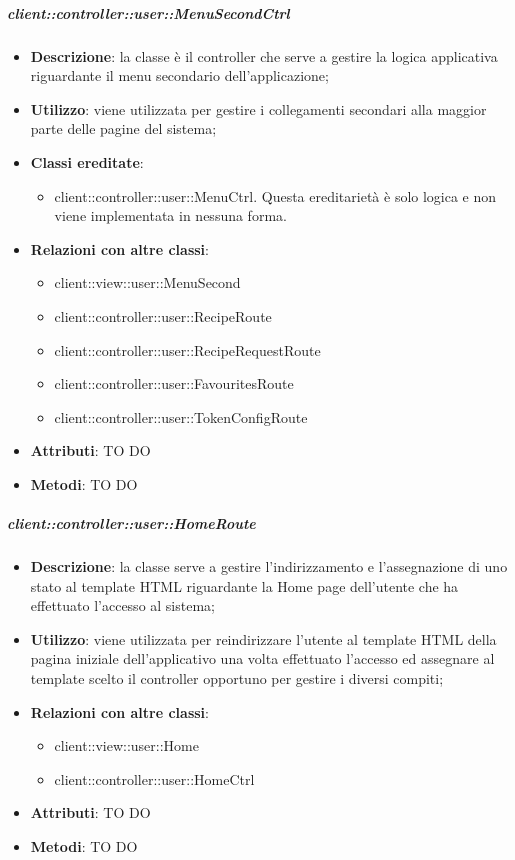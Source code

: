		\subparagraph{client::controller::user::MenuSecondCtrl} %
		\label{subp:client_controller_user_menusecondctrl}
			\begin{itemize}
				\item \textbf{Descrizione}: la classe è il controller che serve a gestire la logica applicativa riguardante il menu secondario dell'applicazione;
				\item \textbf{Utilizzo}: viene utilizzata per gestire i collegamenti secondari alla maggior parte delle pagine del sistema;
				\item \textbf{Classi ereditate}:
					\begin{itemize}
						\item client::controller::user::MenuCtrl. Questa ereditarietà è solo logica e non viene implementata in nessuna forma.
					\end{itemize}
				\item \textbf{Relazioni con altre classi}:
					\begin{itemize}
						\item client::view::user::MenuSecond
						\item client::controller::user::RecipeRoute
						\item client::controller::user::RecipeRequestRoute
						\item client::controller::user::FavouritesRoute
						\item client::controller::user::TokenConfigRoute
					\end{itemize}
				\item \textbf{Attributi}: TO DO
				\item \textbf{Metodi}: TO DO
			\end{itemize}


		\subparagraph{client::controller::user::HomeRoute} %
		\label{subp:bdsm_app_client_controller_user_homerouteconfig}
			\begin{itemize}
				\item \textbf{Descrizione}: la classe serve a gestire l'indirizzamento e l'assegnazione di uno stato al template HTML riguardante la Home page dell'utente che ha effettuato l'accesso al sistema;
				\item \textbf{Utilizzo}: viene utilizzata per reindirizzare l'utente al template HTML della pagina iniziale dell'applicativo una volta effettuato l'accesso ed assegnare al template scelto il controller opportuno per gestire i diversi compiti;
				\item \textbf{Relazioni con altre classi}:
					\begin{itemize}
						\item client::view::user::Home
						\item client::controller::user::HomeCtrl
					\end{itemize}
				\item \textbf{Attributi}: TO DO
				\item \textbf{Metodi}: TO DO
			\end{itemize}

